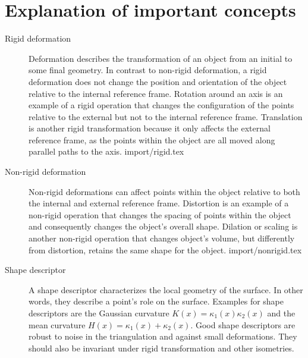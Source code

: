\documentclass[class=article, crop=false]{standalone}
\begin{document}
\section{Explanation of important concepts}
\label{sec:app_imp_concepts}
\begin{description}
    \item[Rigid deformation] Deformation describes the transformation of an object from an initial to some final geometry. In contrast to non-rigid deformation, a rigid deformation does not change the position and orientation of the object relative to the internal reference frame. Rotation around an axis is an example of a rigid operation that changes the configuration of the points relative to the external but not to the internal reference frame. Translation is another rigid transformation because it only affects the external reference frame, as the points within the object are all moved along parallel paths to the axis.
    {import/rigid.tex}
    
    \item[Non-rigid deformation] Non-rigid deformations can affect points within the object relative to both the internal and external reference frame. Distortion is an example of a non-rigid operation that changes the spacing of points within the object and consequently changes the object's overall shape. Dilation or scaling is another non-rigid operation that changes object's volume, but differently from distortion, retains the same shape for the object.
    {import/nonrigid.tex}
    
    
    \item[Shape descriptor] A shape descriptor characterizes the local geometry of the surface. In other words, they describe a point's role on the surface. Examples for shape descriptors are the Gaussian curvature $K(x) = \kappa_1(x)\kappa_2(x)$ and the mean curvature $H(x) = \kappa_1(x)+\kappa_2(x)$. Good shape descriptors are robust to noise in the triangulation and against small deformations. They should also be invariant under rigid transformation and other isometries. \cite{stanfod_iso}
    

\end{description}
\end{document}
